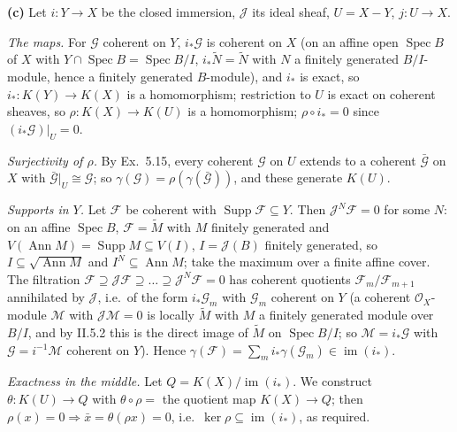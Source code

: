 \documentclass[11pt]{article}
\begin{document}
\textbf{(c)} Let $i:Y\to X$ be the closed immersion, $\mathcal J$ its ideal sheaf, $U=X-Y$, $j:U\to X$. 

\emph{The maps.} For $\mathcal G$ coherent on $Y$, $i_*\mathcal G$ is coherent on $X$ (on an affine open $\operatorname{Spec}B$ of $X$ with $Y\cap\operatorname{Spec}B=\operatorname{Spec}B/I$, $i_*\widetilde N=\widetilde N$ with $N$ a finitely generated $B/I$-module, hence a finitely generated $B$-module), and $i_*$ is exact, so $i_*:K(Y)\to K(X)$ is a homomorphism; restriction to $U$ is exact on coherent sheaves, so $\rho:K(X)\to K(U)$ is a homomorphism; $\rho\circ i_*=0$ since $(i_*\mathcal G)|_U=0$.

\emph{Surjectivity of $\rho$.} By Ex.~5.15, every coherent $\mathcal G$ on $U$ extends to a coherent $\bar{\mathcal G}$ on $X$ with $\bar{\mathcal G}|_U\cong\mathcal G$; so $\gamma(\mathcal G)=\rho(\gamma(\bar{\mathcal G}))$, and these generate $K(U)$.

\emph{Supports in $Y$.} Let $\mathcal F$ be coherent with $\operatorname{Supp}\mathcal F\subseteq Y$. Then $\mathcal J^N\mathcal F=0$ for some $N$: on an affine $\operatorname{Spec}B$, $\mathcal F=\widetilde M$ with $M$ finitely generated and $V(\operatorname{Ann}M)=\operatorname{Supp}M\subseteq V(I)$, $I=\mathcal J(B)$ finitely generated, so $I\subseteq\sqrt{\operatorname{Ann}M}$ and $I^N\subseteq\operatorname{Ann}M$; take the maximum over a finite affine cover. The filtration $\mathcal F\supseteq\mathcal J\mathcal F\supseteq\dots\supseteq\mathcal J^N\mathcal F=0$ has coherent quotients $\mathcal F_m/\mathcal F_{m+1}$ annihilated by $\mathcal J$, i.e.\ of the form $i_*\mathcal G_m$ with $\mathcal G_m$ coherent on $Y$ (a coherent $\mathcal O_X$-module $\mathcal M$ with $\mathcal J\mathcal M=0$ is locally $\widetilde M$ with $M$ a finitely generated module over $B/I$, and by II.5.2 this is the direct image of $\widetilde M$ on $\operatorname{Spec}B/I$; so $\mathcal M=i_*\mathcal G$ with $\mathcal G=i^{-1}\mathcal M$ coherent on $Y$). Hence $\gamma(\mathcal F)=\sum_m i_*\gamma(\mathcal G_m)\in\operatorname{im}(i_*)$.

\emph{Exactness in the middle.} Let $Q=K(X)/\operatorname{im}(i_*)$. We construct $\theta:K(U)\to Q$ with $\theta\circ\rho=$ the quotient map $K(X)\to Q$; then $\rho(x)=0\Rightarrow\bar x=\theta(\rho x)=0$, i.e.\ $\ker\rho\subseteq\operatorname{im}(i_*)$, as required.
\end{document}
